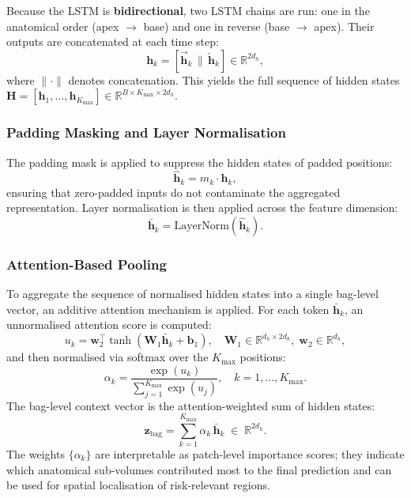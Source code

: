 \documentclass[11pt,a4paper]{article}
\begin{document}
Because the LSTM is \textbf{bidirectional}, two LSTM chains are run:
one in the anatomical order (apex $\to$ base) and one in reverse
(base $\to$ apex). Their outputs are concatenated at each time step:
\begin{equation}
  \mathbf{h}_k = \left[\overrightarrow{\mathbf{h}}_k \,\Big\|\, \overleftarrow{\mathbf{h}}_k\right]
  \in \mathbb{R}^{2 d_h},
\end{equation}
where $\|\cdot\|$ denotes concatenation. This yields the full sequence of
hidden states $\mathbf{H} = [\mathbf{h}_1, \ldots, \mathbf{h}_{K_{\max}}]
\in \mathbb{R}^{B \times K_{\max} \times 2d_h}$.

\subsubsection{Padding Masking and Layer Normalisation}

The padding mask is applied to suppress the hidden states of padded positions:
\begin{equation}
  \hat{\mathbf{h}}_k = m_k \cdot \mathbf{h}_k,
\end{equation}
ensuring that zero-padded inputs do not contaminate the aggregated representation.
Layer normalisation is then applied across the feature dimension:
\begin{equation}
  \bar{\mathbf{h}}_k = \text{LayerNorm}(\hat{\mathbf{h}}_k).
\end{equation}

\subsubsection{Attention-Based Pooling}

To aggregate the sequence of normalised hidden states into a single bag-level
vector, an additive attention mechanism is applied. For each token
$\bar{\mathbf{h}}_k$, an unnormalised attention score is computed:
\begin{equation}
  u_k = \mathbf{w}_2^\top \tanh\!\left(\mathbf{W}_1 \bar{\mathbf{h}}_k + \mathbf{b}_1\right),
  \quad
  \mathbf{W}_1 \in \mathbb{R}^{d_h \times 2d_h},\;
  \mathbf{w}_2 \in \mathbb{R}^{d_h},
\end{equation}
and then normalised via softmax over the $K_{\max}$ positions:
\begin{equation}
  \alpha_k = \frac{\exp(u_k)}{\sum_{j=1}^{K_{\max}} \exp(u_j)},
  \quad k = 1, \ldots, K_{\max}.
\end{equation}
The bag-level context vector is the attention-weighted sum of hidden states:
\begin{equation}
  \mathbf{z}_{\text{bag}} = \sum_{k=1}^{K_{\max}} \alpha_k \,\bar{\mathbf{h}}_k \;\in\; \mathbb{R}^{2d_h}.
\end{equation}
The weights $\{\alpha_k\}$ are interpretable as patch-level importance scores;
they indicate which anatomical sub-volumes contributed most to the final
prediction and can be used for spatial localisation of risk-relevant regions.
\end{document}
